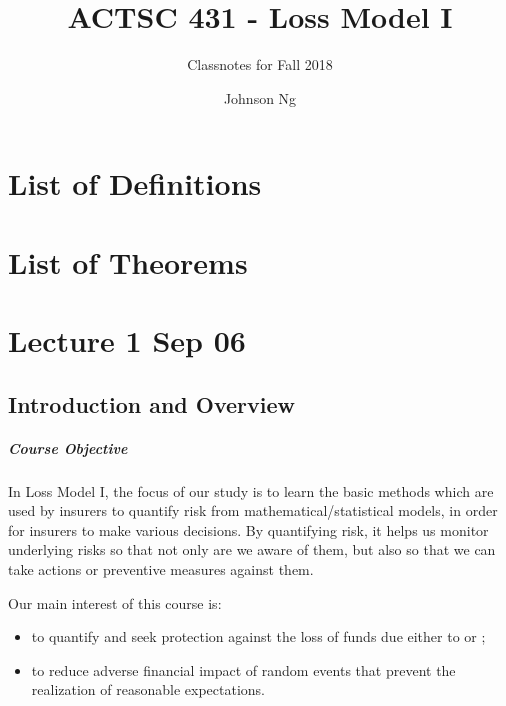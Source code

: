 \documentclass[notoc,notitlepage]{tufte-book}
\title{ACTSC 431 - Loss Model I}
\author{Johnson Ng}
\subtitle{Classnotes for Fall 2018}
\begin{document}
\hypersetup{pageanchor=false}
\maketitle
\hypersetup{pageanchor=true}
\tableofcontents

\chapter*{\faBook \enspace List of Definitions}

\chapter*{\faCoffee \enspace List of Theorems}

\chapter{Lecture 1 Sep 06}%
\label{chp:lecture_1_sep_06}

\section{Introduction and Overview}%
\label{sec:introduction_and_overview}

\paragraph{Course Objective} In Loss Model I, the focus of our study is to learn the basic methods which are used by insurers to quantify risk from mathematical/statistical models, in order for insurers to make various decisions. By quantifying risk, it helps us monitor underlying risks so that not only are we aware of them, but also so that we can take actions or preventive measures against them.

Our main interest of this course is:
\begin{itemize}
  \item to quantify and seek protection against the loss of funds due either to  or ;
  \item to reduce adverse financial impact of random events that prevent the realization of reasonable expectations.
\end{itemize}
\end{document}
